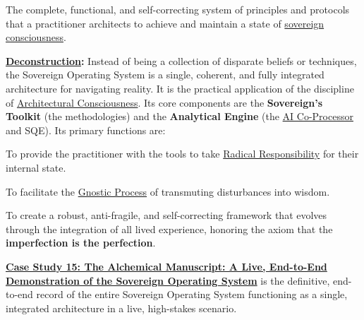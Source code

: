 \item[\hypertarget{gloss:sovereign_operating_system}{Sovereign Operating System}] 
    The complete, functional, and self-correcting system of principles and protocols that a practitioner architects to achieve and maintain a state of \hyperlink{gloss:sovereign_consciousness}{sovereign consciousness}.
    \begin{nobullet}
        \item \textbf{\hyperlink{gloss:deconstruction}{Deconstruction}:} Instead of being a collection of disparate beliefs or techniques, the Sovereign Operating System is a single, coherent, and fully integrated architecture for navigating reality. It is the practical application of the discipline of \hyperlink{gloss:architectural_consciousness}{Architectural Consciousness}. Its core components are the \textbf{Sovereign's Toolkit} (the methodologies) and the \textbf{Analytical Engine} (the \hyperlink{gloss:ai_co_processor}{AI Co-Processor} and SQE). Its primary functions are:
        \begin{nobullet}
            \item To provide the practitioner with the tools to take \hyperlink{gloss:radical_responsibility}{Radical Responsibility} for their internal state.
            \item To facilitate the \hyperlink{gloss:gnostic_process}{Gnostic Process} of transmuting disturbances into wisdom.
            \item To create a robust, anti-fragile, and self-correcting framework that evolves through the integration of all lived experience, honoring the axiom that the \textbf{imperfection is the perfection}.
        \end{nobullet}
    \end{nobullet}

    \hyperref[case_study_15]{\textbf{Case Study 15: The Alchemical Manuscript: A Live, End-to-End Demonstration of the Sovereign Operating System}} is the definitive, end-to-end record of the entire Sovereign Operating System functioning as a single, integrated architecture in a live, high-stakes scenario.

